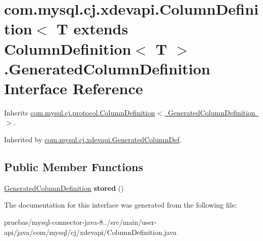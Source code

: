 \hypertarget{interfacecom_1_1mysql_1_1cj_1_1xdevapi_1_1_column_definition_1_1_generated_column_definition}{}\section{com.\+mysql.\+cj.\+xdevapi.\+Column\+Definition$<$ T extends Column\+Definition$<$ T $>$.Generated\+Column\+Definition Interface Reference}
\label{interfacecom_1_1mysql_1_1cj_1_1xdevapi_1_1_column_definition_1_1_generated_column_definition}


Inherits \mbox{\hyperlink{interfacecom_1_1mysql_1_1cj_1_1protocol_1_1_column_definition}{com.\+mysql.\+cj.\+protocol.\+Column\+Definition$<$ Generated\+Column\+Definition $>$}}.



Inherited by \mbox{\hyperlink{classcom_1_1mysql_1_1cj_1_1xdevapi_1_1_generated_column_def}{com.\+mysql.\+cj.\+xdevapi.\+Generated\+Column\+Def}}.

\subsection*{Public Member Functions}
\begin{DoxyCompactItemize}
\item 
\mbox{\label{interfacecom_1_1mysql_1_1cj_1_1xdevapi_1_1_column_definition_1_1_generated_column_definition_a47428639edd0873f22e6e540a8a7d7d2}} 
\mbox{\hyperlink{interfacecom_1_1mysql_1_1cj_1_1xdevapi_1_1_column_definition_1_1_generated_column_definition}{Generated\+Column\+Definition}} {\bfseries stored} ()
\end{DoxyCompactItemize}


The documentation for this interface was generated from the following file\+:\begin{DoxyCompactItemize}
\item 
pruebas/mysql-\/connector-\/java-\/8../src/main/user-\/api/java/com/mysql/cj/xdevapi/Column\+Definition.\+java\end{DoxyCompactItemize}
